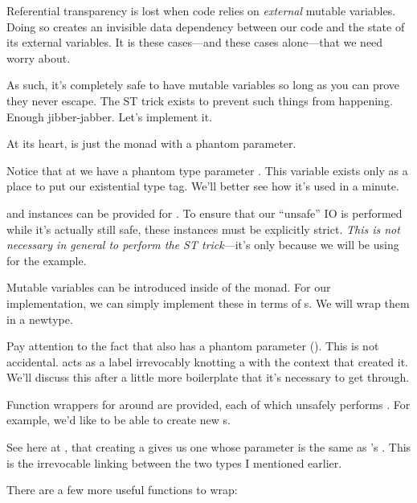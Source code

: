 \documentclass[book.tex]{subfiles}
\begin{document}
Referential transparency is lost when code relies on \emph{external} mutable
variables. Doing so creates an invisible data dependency between our code and
the state of its external variables. It is these cases---and these cases
alone---that we need worry about.

As such, it's completely safe to have mutable variables so long as you can prove
they never escape. The ST trick exists to prevent such things from happening.
Enough jibber-jabber. Let's implement it.

At its heart,  is just the  monad with a phantom 
parameter.


Notice that at  we have a \gls{phantom} type parameter . This
variable exists only as a place to put our existential type tag. We'll better
see how it's used in a minute.

 and  instances can be provided for . To ensure
that our ``unsafe'' IO is performed while it's actually still safe, these
instances must be explicitly strict. \emph{This is not necessary in general to
perform the ST trick}---it's only because we will be using 
for the example.


Mutable variables can be introduced inside of the  monad. For our
implementation, we can simply implement these in terms of s. We will
wrap them in a newtype.


Pay attention to the fact that  also has a phantom  parameter
(). This is not accidental.  acts as a label irrevocably knotting a
 with the  context that created it. We'll discuss this after a
little more boilerplate that it's necessary to get through.

Function wrappers for  around  are provided, each of which
unsafely performs . For example, we'd like to be able to create new
s.


See here at , that creating a  gives us one whose 
parameter is the same as 's . This is the irrevocable linking
between the two types I mentioned earlier.

There are a few more useful functions to wrap:
\end{document}
